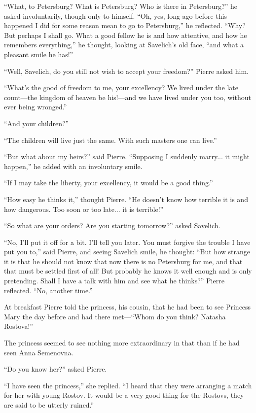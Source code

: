 ``What, to Petersburg? What is Petersburg? Who is there in
Petersburg?''  he asked involuntarily, though only to
himself. ``Oh, yes, long ago before this happened I did for some
reason mean to go to Petersburg,'' he reflected. ``Why? But
perhaps I shall go. What a good fellow he is and how attentive,
and how he remembers everything,'' he thought, looking at
Savelich's old face, ``and what a pleasant smile he has!''

``Well, Savelich, do you still not wish to accept your freedom?''
Pierre asked him.

``What's the good of freedom to me, your excellency? We lived
under the late count---the kingdom of heaven be his!---and we
have lived under you too, without ever being wronged.''

``And your children?''

``The children will live just the same. With such masters one can
live.''

``But what about my heirs?'' said Pierre. ``Supposing I suddenly
marry...  it might happen,'' he added with an involuntary smile.

``If I may take the liberty, your excellency, it would be a good
thing.''

``How easy he thinks it,'' thought Pierre. ``He doesn't know how
terrible it is and how dangerous. Too soon or too late... it is
terrible!''

``So what are your orders? Are you starting tomorrow?'' asked
Savelich.

``No, I'll put it off for a bit. I'll tell you later. You must
forgive the trouble I have put you to,'' said Pierre, and seeing
Savelich smile, he thought: ``But how strange it is that he
should not know that now there is no Petersburg for me, and that
that must be settled first of all! But probably he knows it well
enough and is only pretending. Shall I have a talk with him and
see what he thinks?'' Pierre reflected. ``No, another time.''

At breakfast Pierre told the princess, his cousin, that he had
been to see Princess Mary the day before and had there
met---``Whom do you think?  Natasha Rostova!''

The princess seemed to see nothing more extraordinary in that
than if he had seen Anna Semenovna.

``Do you know her?'' asked Pierre.

``I have seen the princess,'' she replied. ``I heard that they
were arranging a match for her with young Rostov. It would be a
very good thing for the Rostovs, they are said to be utterly
ruined.''

